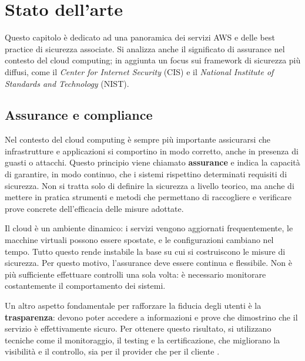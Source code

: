 \chapter{Stato dell'arte}
\label{cap:stato_arte}

Questo capitolo è dedicato ad una panoramica dei servizi AWS e delle best practice di sicurezza associate. Si analizza anche il significato di assurance nel contesto del cloud computing; in aggiunta un focus sui framework di sicurezza più diffusi, come il \textit{Center for Internet Security} (CIS) e il \textit{National Institute of Standards and Technology} (NIST). 

\section{Assurance e compliance}
\label{sec:assurance}

Nel contesto del cloud computing è sempre più importante assicurarsi che infrastrutture e applicazioni si comportino in modo corretto, anche in presenza di guasti o attacchi. Questo principio viene chiamato \textbf{assurance} e indica la capacità di garantire, in modo continuo, che i sistemi rispettino determinati requisiti di sicurezza. Non si tratta solo di definire la sicurezza a livello teorico, ma anche di mettere in pratica strumenti e metodi che permettano di raccogliere e verificare prove concrete dell'efficacia delle misure adottate.

Il cloud è un ambiente dinamico: i servizi vengono aggiornati frequentemente, le macchine virtuali possono essere spostate, e le configurazioni cambiano nel tempo. Tutto questo rende instabile la base su cui si costruiscono le misure di sicurezza. Per questo motivo, l'assurance deve essere continua e flessibile. Non è più sufficiente effettuare controlli una sola volta: è necessario monitorare costantemente il comportamento dei sistemi.

Un altro aspetto fondamentale per rafforzare la fiducia degli utenti è la \textbf{trasparenza}: devono poter accedere a informazioni e prove che dimostrino che il servizio è effettivamente sicuro. Per ottenere questo risultato, si utilizzano tecniche come il monitoraggio, il testing e la certificazione, che migliorano la visibilità e il controllo, sia per il provider che per il cliente \cite{ardagna2015security}.

